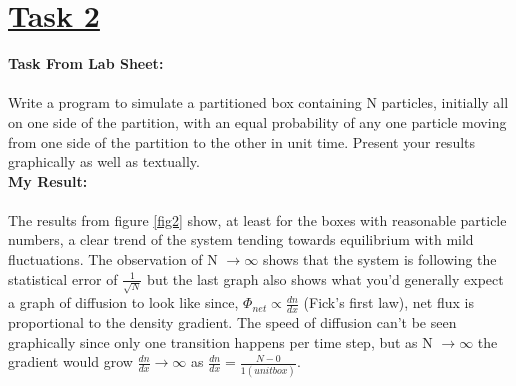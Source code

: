 \documentclass[12pt, A4]{article}
\begin{document}
\section*{\underline{Task 2}}
\textbf{Task From Lab Sheet:} \\ \\ Write a program to simulate a partitioned box containing N particles, initially all on one side of the partition, with an equal probability of any one particle moving from one side of the partition to the other in unit time. Present your results graphically as well as textually.
\vspace{1.5em}\\
\textbf{My Result:} \\ \\ The results from figure \ref{fig2} show, at least for the boxes with reasonable particle numbers, a clear trend of the system tending towards equilibrium with mild fluctuations. 
The observation of N $\rightarrow\infty$ shows that the system is following the statistical error of $\frac{1}{\sqrt{N}}$ but the last graph also shows what you'd generally expect a graph of diffusion to look like since, $\Phi_{net}\propto\frac{dn}{dx}$ (Fick's first law), net flux is proportional to the density gradient. 
The speed of diffusion can't be seen graphically since only one transition happens per time step, but as N $\rightarrow\infty$ the gradient would grow $\frac{dn}{dx}\rightarrow\infty$ as $\frac{dn}{dx}=\frac{N-0}{1 (unit box)}$.
\end{document}
